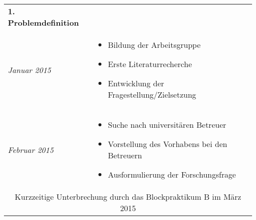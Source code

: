 \begin{longtable}{l|p{9.8cm}}
	
	\textbf{1. Problemdefinition} & \\
	\emph{Januar 2015} &
	\vspace*{-0.6cm}
	\begin{itemize}[nosep,topsep=-0.6cm]
		\item Bildung der Arbeitsgruppe
		\item Erste Literaturrecherche
		\item Entwicklung der Fragestellung/Zielsetzung
	\end{itemize} \\* 
	
	\emph{Februar 2015} & 
	\vspace*{-0.6cm}
	\begin{itemize}[nosep,topsep=-0.6cm]
		\item Suche nach universitären Betreuer
		\item Vorstellung des Vorhabens bei den Betreuern
		\item Ausformulierung der Forschungsfrage
	\end{itemize} \\
	
	\multicolumn{2}{c}{Kurzzeitige Unterbrechung durch das Blockpraktikum B im März 2015} \\*
	

\end{longtable}
